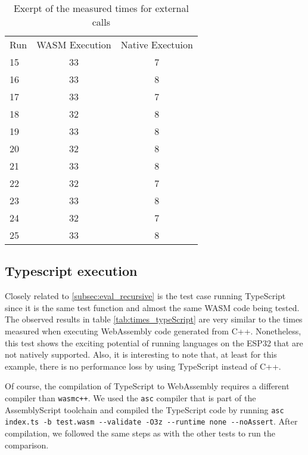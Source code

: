 \begin{table} [h]
    \begin{tabular}{l c c}
        Run & WASM Execution & Native Exectuion \\
        15  & 33             & 7                \\
        16  & 33             & 8                \\
        17  & 33             & 7                \\
        18  & 32             & 8                \\
        19  & 33             & 8                \\
        20  & 32             & 8                \\
        21  & 33             & 8                \\
        22  & 32             & 7                \\
        23  & 33             & 8                \\
        24  & 32             & 7                \\
        25  & 33             & 8                \\
    \end{tabular}
    \caption{Exerpt of the measured times for external calls}
    \label{tab:times_native}
\end{table}

\subsection{Typescript execution}

Closely related to \ref{subsec:eval_recursive} is the test case running TypeScript since it is the same test function and almost the same WASM code being tested. The observed results in table \ref{tab:times_typeScript} are very similar to the times measured when executing WebAssembly code generated from C++. Nonetheless, this test shows the exciting potential of running languages on the ESP32 that are not natively supported. Also, it is interesting to note that, at least for this example, there is no performance loss by using TypeScript instead of C++.

\begin{sloppypar}
    Of course, the compilation of TypeScript to WebAssembly requires a different compiler than \lstinline{wasmc++}. We used the \lstinline{asc} compiler that is part of the AssemblyScript toolchain and compiled the TypeScript code by running \lstinline{asc index.ts -b test.wasm --validate -O3z --runtime none --noAssert}. After compilation, we followed the same steps as with the other tests to run the comparison.
\end{sloppypar}

